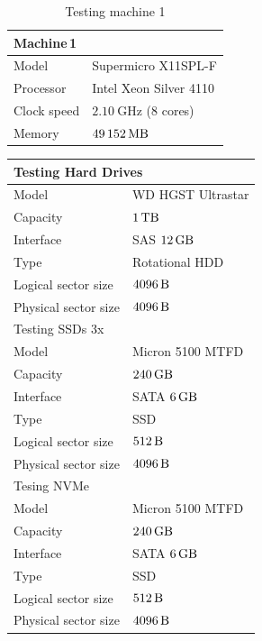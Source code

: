 \documentclass[
  color, %
  table, %
  lof,   %
  lot,   %
]{fithesis3}
\begin{document}
\begin{table}
\centering
\begin{tabular}{|l|l|}
\hline
   \multicolumn{2}{|l|}{Machine\,1} \\ \hline %
    Model & Supermicro X11SPL-F\\
    \hline
    Processor & Intel Xeon Silver 4110  \\
    \hline
    Clock speed & $\SI{2.10}{\giga\hertz}$ (8 cores) \\
    \hline
    Memory & $\SI{49152}{\mega\byte}$ \\
    \hline
\end{tabular}
\caption{Testing machine 1}
\end{table}


\begin{table}
\centering
\begin{tabular}{|l|l|}
\hline
   \multicolumn{2}{|l|}{Testing Hard Drives} \\ \hline %
    Model & WD HGST Ultrastar\\
    \hline
    Capacity & $\SI{1}{\tera\byte}$  \\
    \hline
    Interface & SAS $\SI{12}{\giga\byte}$  \\
    \hline
    Type & Rotational HDD \\
    \hline    
    Logical sector size & $\SI{4096}{\byte}$ \\    
    \hline    
    Physical sector size & $\SI{4096}{\byte}$ \\
    \hline
    \hline
    \multicolumn{2}{|l|}{Testing SSDs 3x } \\ \hline %
     Model & Micron 5100 MTFD \\
    \hline
     Capacity & $\SI{240}{\giga\byte}$  \\
    \hline
    Interface & SATA $\SI{6}{\giga\byte}$  \\
    \hline
    Type & SSD \\
    \hline    
    Logical sector size & $\SI{512}{\byte}$ \\    
    \hline    
     Physical sector size & $\SI{4096}{\byte}$ \\
    \hline

    \hline
    \multicolumn{2}{|l|}{Tesing NVMe} \\ \hline %
     Model & Micron 5100 MTFD \\
    \hline
     Capacity & $\SI{240}{\giga\byte}$  \\
    \hline
    Interface & SATA $\SI{6}{\giga\byte}$  \\
    \hline
    Type & SSD \\
    \hline    
    Logical sector size & $\SI{512}{\byte}$ \\    
    \hline    
     Physical sector size & $\SI{4096}{\byte}$ \\


\end{tabular}
\end{table}
\end{document}
